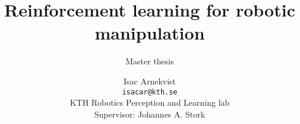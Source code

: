 \documentclass[12pt,a4paper,abstract=on,bibliography=totoc]{scrartcl}
\title{Reinforcement learning for robotic manipulation}
\subtitle{Master thesis}
\author{Isac Arnekvist \\ \texttt{isacar@kth.se} \\ KTH Robotics Perception and Learning lab \\ Supervisor: Johannes A. Stork}
\begin{document}
\maketitle

\tableofcontents














{}

\end{document}
